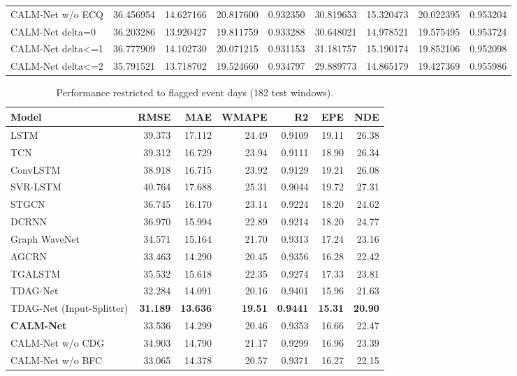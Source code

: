 \begin{table}[!t]
\begin{tabular}{lrrrrrrrr}
CALM-Net w/o ECQ & 36.456954 & 14.627166 & 20.817600 & 0.932350 & 30.819653 & 15.320473 & 20.022395 & 0.953204 \\
CALM-Net delta=0 & 36.203286 & 13.920427 & 19.811759 & 0.933288 & 30.648021 & 14.978521 & 19.575495 & 0.953724 \\
CALM-Net delta<=1 & 36.777909 & 14.102730 & 20.071215 & 0.931153 & 31.181757 & 15.190174 & 19.852106 & 0.952098 \\
CALM-Net delta<=2 & 35.791521 & 13.718702 & 19.524660 & 0.934797 & 29.889773 & 14.865179 & 19.427369 & 0.955986 \\
\bottomrule
\end{tabular}
\end{table}

\begin{table}[!t]
\caption{Performance restricted to flagged event days (182 test windows).}
\label{tab:event_results}
\centering
\footnotesize
\begin{tabular}{lrrrrrr}
\toprule
Model & RMSE & MAE & WMAPE & R2 & EPE & NDE \\
\midrule
LSTM & 39.373 & 17.112 & 24.49 & 0.9109 & 19.11 & 26.38 \\
TCN & 39.312 & 16.729 & 23.94 & 0.9111 & 18.90 & 26.34 \\
ConvLSTM & 38.918 & 16.715 & 23.92 & 0.9129 & 19.21 & 26.08 \\
SVR-LSTM & 40.764 & 17.688 & 25.31 & 0.9044 & 19.72 & 27.31 \\
STGCN & 36.745 & 16.170 & 23.14 & 0.9224 & 18.20 & 24.62 \\
DCRNN & 36.970 & 15.994 & 22.89 & 0.9214 & 18.20 & 24.77 \\
Graph WaveNet & 34.571 & 15.164 & 21.70 & 0.9313 & 17.24 & 23.16 \\
AGCRN & 33.463 & 14.290 & 20.45 & 0.9356 & 16.28 & 22.42 \\
TGALSTM & 35.532 & 15.618 & 22.35 & 0.9274 & 17.33 & 23.81 \\
TDAG-Net & 32.284 & 14.091 & 20.16 & 0.9401 & 15.96 & 21.63 \\
TDAG-Net (Input-Splitter) & \textbf{31.189} & \textbf{13.636} & \textbf{19.51} & \textbf{0.9441} & \textbf{15.31} & \textbf{20.90} \\
\textbf{CALM-Net} & 33.536 & 14.299 & 20.46 & 0.9353 & 16.66 & 22.47 \\
CALM-Net w/o CDG & 34.903 & 14.790 & 21.17 & 0.9299 & 16.96 & 23.39 \\
CALM-Net w/o BFC & 33.065 & 14.378 & 20.57 & 0.9371 & 16.27 & 22.15 \\

\end{tabular}
\end{table}
